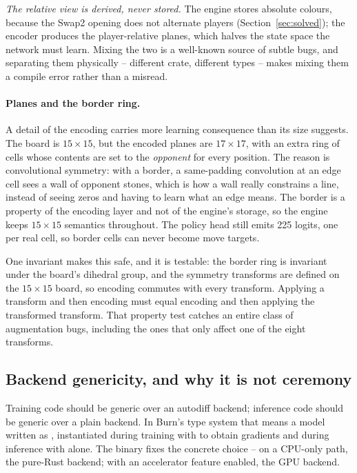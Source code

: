 \emph{The relative view is derived, never stored.} The engine stores absolute
colours, because the Swap2 opening does not alternate players
(Section~\ref{sec:solved}); the encoder produces the player-relative planes,
which halves the state space the network must learn. Mixing the two is a
well-known source of subtle bugs, and separating them physically -- different
crate, different types -- makes mixing them a compile error rather than a
misread.

\paragraph{Planes and the border ring.} A detail of the encoding carries more
learning consequence than its size suggests. The board is $15\times15$, but the
encoded planes are $17\times17$, with an extra ring of cells whose contents are
set to the \emph{opponent} for every position. The reason is convolutional
symmetry: with a border, a same-padding convolution at an edge cell sees a wall
of opponent stones, which is how a wall really constrains a line, instead of
seeing zeros and having to learn what an edge means. The border is a property of
the encoding layer and not of the engine's storage, so the engine keeps
$15\times15$ semantics throughout. The policy head still emits 225 logits, one
per real cell, so border cells can never become move targets.

One invariant makes this safe, and it is testable: the border ring is invariant
under the board's dihedral group, and the symmetry transforms are defined on the
$15\times15$ board, so encoding commutes with every transform. Applying a
transform and then encoding must equal encoding and then applying the transformed
transform. That property test catches an entire class of augmentation bugs,
including the ones that only affect one of the eight transforms.

\subsection{Backend genericity, and why it is not ceremony}
\label{sec:backends}

Training code should be generic over an autodiff backend; inference code should
be generic over a plain backend. In Burn's type system that means a model written
as , instantiated during training with
 to obtain gradients and during inference with  alone.
The binary fixes the concrete choice -- on a CPU-only path, the pure-Rust
 backend; with an accelerator feature enabled, the GPU backend.

